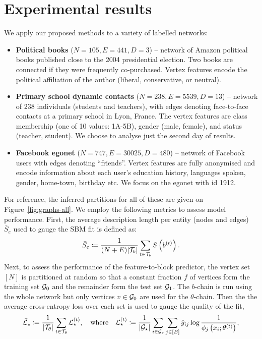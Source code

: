 \section{Experimental results}
\label{sec:experiments}

We apply our proposed methods to a variety of labelled networks:

\begin{itemize}
	\item \textbf{Political books} \cite{polbooks} ($N=105, E=441, D=3$) -- network of Amazon political books published close to the 2004 presidential election. Two books are connected if they were frequently co-purchased. Vertex features encode the political affiliation of the author (liberal, conservative, or neutral).
	\item \textbf{Primary school dynamic contacts} \cite{schools} ($N=238, E=5539, D=13$) -- network of 238 individuals (students and teachers),
with edges denoting face-to-face contacts at a primary school in Lyon, France. 
The vertex features are class membership (one of 10 values: 1A-5B), gender (male, female), and status (teacher, student). We choose to analyse just the second day of results.
	\item \textbf{Facebook egonet} \cite{fb-snap} ($N=747, E=30025, D=480$) -- network of Facebook users with edges denoting ``friends''.
Vertex features are fully anonymised and encode information about each user's education history, languages spoken, gender, home-town, birthday etc. We focus on the egonet with id 1912.
\end{itemize}
%
For reference, the inferred partitions for all of these are given on Figure~\ref{fig:graphs-all}.
We employ the following metrics to assess model performance. 
First, the average
description length per entity (nodes and edges) 
$\bar{S}_e$ 
used to gauge the SBM fit is defined as:
%
\begin{equation}
	\bar{S}_e \coloneqq \frac{1}{(N+E) |\mathcal{T}_b|} \sum_{t\in \mathcal{T}_b} S \left( b^{(t)} \right).
	\label{eqn:mean-dl}
\end{equation}
%
Next, to assess the performance of the feature-to-block predictor, 
the vertex set $[N]$ 
is partitioned at random so that 
a constant fraction $f$ of vertices form the training set $\mathcal{G}_0$ and 
the remainder form the test set $\mathcal{G}_1$.
The $b$-chain is run using the whole network but only vertices $v \in \mathcal{G}_0$ are 
used for the $\theta$-chain. 
Then the  the average cross-entropy loss 
over each set is used to gauge the quality of the fit,
%
\begin{equation}
	\bar{\mathcal{L}}_\star \coloneqq \frac{1}{|\mathcal{T}_\theta|} \sum_{t \in \mathcal{T}_\theta} \mathcal{L}_\star^{(t)},
	\quad \textrm{where} \quad
	\mathcal{L}_\star^{(t)} \coloneqq \frac{1}{|\mathcal{G}_\star|} \sum_{i \in \mathcal{G}_\star}\sum_{j \in [B]} \hat{y}_{ij} \log \frac{1}{\phi_j \left(x_i; \theta^{(t)} \right)},
	\label{eqn:cross-entropy-loss}
\end{equation}
